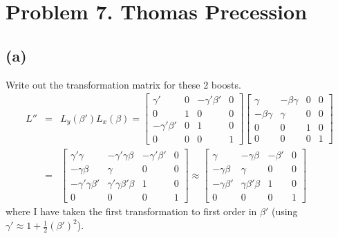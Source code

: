 \documentclass[11pt]{amsart}
\begin{document}
\section*{Problem 7. Thomas Precession} 
\subsection*{(a)} Write out the transformation matrix for these 2 boosts.
\begin{eqnarray*} 
L''&=& L_y(\beta')L_x(\beta) = \begin{bmatrix}
	\gamma' & 0 & -\gamma'\beta' & 0 \\
	0 & 1 & 0 & 0 \\
	-\gamma'\beta' & 0 & 1 & 0 \\
	0 & 0 & 0 & 1 
	\end{bmatrix}\begin{bmatrix}
	\gamma & -\beta\gamma & 0 & 0 \\
	-\beta\gamma & \gamma & 0 & 0 \\
	0 & 0 & 1 & 0 \\
	0 & 0 & 0 & 1 
	\end{bmatrix} \\
&=& \begin{bmatrix}
	\gamma'\gamma & -\gamma'\gamma \beta & -\gamma' \beta' & 0 \\
	- \gamma\beta & \gamma & 0 & 0 \\
	-\gamma' \gamma \beta' & \gamma' \gamma \beta' \beta & 1 & 0 \\
	0 & 0 & 0 & 1 
	\end{bmatrix} \approx  \begin{bmatrix}
	\gamma & -\gamma \beta & - \beta' & 0 \\
	- \gamma \beta & \gamma & 0 & 0 \\
	- \gamma \beta' & \gamma \beta' \beta & 1 & 0 \\
	0 & 0 & 0 & 1 
	\end{bmatrix} 
\end{eqnarray*}
where I have taken the first transformation to first order in $\beta'$ (using $\gamma' \approx 1 + \tfrac{1}{2} (\beta')^2$).
\end{document}
